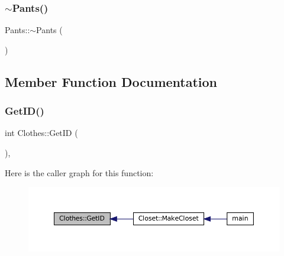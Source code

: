 \mbox{\label{classPants_a22fa728c533ab55fbbd1b77b8d9ad860}} 
\subsubsection{\texorpdfstring{$\sim$\+Pants()}{~Pants()}}
{\footnotesize\ttfamily Pants\+::$\sim$\+Pants (\begin{DoxyParamCaption}{ }\end{DoxyParamCaption})\hspace{0.3cm}{\ttfamily [virtual]}}



\subsection{Member Function Documentation}
\mbox{\label{classClothes_a3f6dac172f333126d19010f85ec44e4c}} 
\subsubsection{\texorpdfstring{Get\+I\+D()}{GetID()}}
{\footnotesize\ttfamily int Clothes\+::\+Get\+ID (\begin{DoxyParamCaption}{ }\end{DoxyParamCaption})\hspace{0.3cm}{\ttfamily [inline]}, {\ttfamily [inherited]}}

Here is the caller graph for this function\+:
\nopagebreak
\begin{figure}[H]
\begin{center}
\leavevmode
\includegraphics[width=350pt]{classClothes_a3f6dac172f333126d19010f85ec44e4c_icgraph}
\end{center}
\end{figure}
\mbox{\label{classPants_a9b5fcde766a77877bf428e18c65f1e70}} 
